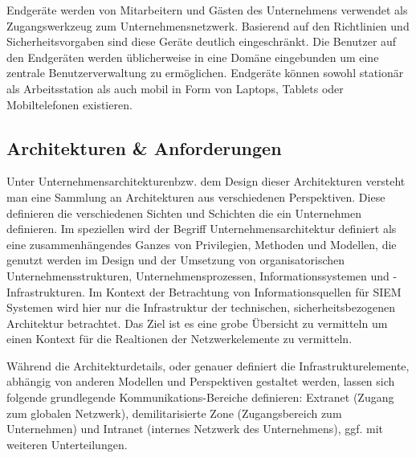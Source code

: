 Endgeräte werden von Mitarbeitern und Gästen des Unternehmens verwendet als Zugangswerkzeug zum Unternehmensnetzwerk. Basierend auf den Richtlinien und Sicherheitsvorgaben sind diese Geräte deutlich eingeschränkt. Die Benutzer auf den Endgeräten werden üblicherweise in eine Domäne eingebunden um eine zentrale Benutzerverwaltung zu ermöglichen. Endgeräte können sowohl stationär als Arbeitsstation als auch mobil in Form von Laptops, Tablets oder Mobiltelefonen existieren. 


\subsection{Architekturen \&  Anforderungen}
Unter \glqq Unternehmensarchitekturen\grqq  bzw. dem Design dieser Architekturen versteht man eine Sammlung an Architekturen aus verschiedenen Perspektiven. Diese definieren die verschiedenen Sichten und Schichten die ein Unternehmen definieren. Im speziellen wird der Begriff Unternehmensarchitektur definiert als eine zusammenhängendes Ganzes von Privilegien, Methoden und Modellen, die genutzt werden im Design und der Umsetzung von organisatorischen Unternehmensstrukturen, Unternehmensprozessen, Informationssystemen und -Infrastrukturen. %
Im Kontext der Betrachtung von Informationsquellen für SIEM Systemen wird hier nur die Infrastruktur der  technischen, sicherheitsbezogenen Architektur betrachtet. Das Ziel ist es eine grobe Übersicht zu vermitteln um einen Kontext für die Realtionen der Netzwerkelemente zu vermitteln.


Während die Architekturdetails, oder genauer definiert die Infrastrukturelemente, abhängig von anderen Modellen und Perspektiven gestaltet werden, lassen sich folgende grundlegende Kommunikations-Bereiche definieren: Extranet (Zugang zum globalen Netzwerk), demilitarisierte Zone (Zugangsbereich zum Unternehmen) und Intranet (internes Netzwerk des Unternehmens), ggf. mit weiteren Unterteilungen. %

